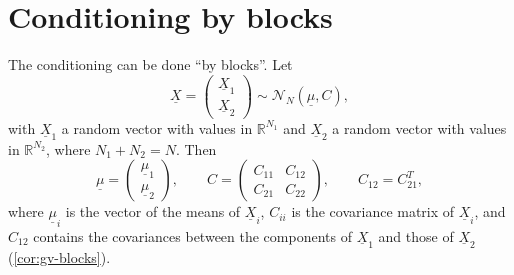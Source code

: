 \section{Conditioning by blocks}\label{sec:gc-blocks}

The conditioning can be done ``by blocks''. Let
\[
  \underline X=\begin{pmatrix}\underline X_1\\\underline X_2\end{pmatrix}\sim\mathcal N_N(\underline\mu,C),
\]
with $\underline X_1$ a random vector with values in $\mathbb R^{N_1}$ and $\underline X_2$ a random vector with values in
$\mathbb R^{N_2}$, where $N_1+N_2=N$. Then
\[
  \underline\mu=\begin{pmatrix}\underline\mu_1\\\underline\mu_2\end{pmatrix},\qquad
  C=\begin{pmatrix}C_{11}&C_{12}\\C_{21}&C_{22}\end{pmatrix},\qquad C_{12}=C_{21}^T,
\]
where $\underline\mu_i$ is the vector of the means of $\underline X_i$, $C_{ii}$ is the covariance matrix of $\underline X_i$, and
$C_{12}$ contains the covariances between the components of $\underline X_1$ and those of $\underline X_2$
(\cref{cor:gv-blocks}).


